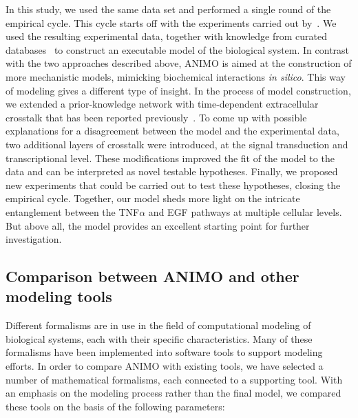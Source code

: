 \documentclass{bmcart}
\begin{document}
In this study, we used the same data set and performed a single round of the empirical cycle.
This cycle starts off with the experiments carried out by~\cite{pathway-compendium}. We used the
resulting experimental data, together with knowledge from curated databases~\cite{kegg,phosphosite}
to construct an executable model of the biological system.
In contrast with the two approaches described above, ANIMO is aimed at the construction of
more mechanistic models, mimicking biochemical interactions \emph{in silico}. This way of modeling
gives a different type of insight. In the process of model construction, we extended a
prior-knowledge network with time-dependent extracellular crosstalk that has been reported
previously~\cite{pathway-autocrine}. To come up with possible explanations for a disagreement
between the model and the experimental data, two additional layers of
crosstalk were introduced, at the signal transduction and transcriptional level. These modifications 
improved the fit of the model to the data and can be interpreted as novel testable hypotheses.
Finally, we proposed new experiments that could be carried out to test these hypotheses, closing the empirical cycle. 
Together, our model sheds more light on the intricate
entanglement between the TNF$\alpha$ and EGF pathways at multiple cellular levels.
But above all,  the model provides an excellent starting point for further investigation.


\subsection*{Comparison between ANIMO and other modeling tools}\label{suppl:comparison-table}
Different formalisms are in use in the field of computational
modeling of biological systems, each with their specific characteristics.
Many of these formalisms have been implemented into
software tools to support modeling efforts. In order to compare
ANIMO with existing tools, we have selected a number of mathematical formalisms,
each connected to a supporting tool. With an emphasis on the modeling
process rather than the final model, we compared these tools on
the basis of the following parameters:
\end{document}
